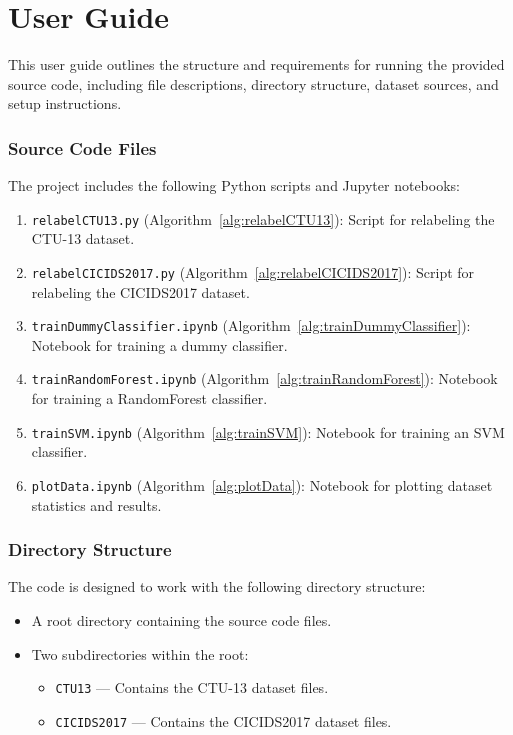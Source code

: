 \chapter{User Guide}\label{chap:user-guide}

This user guide outlines the structure and requirements for running the provided source code, including file descriptions, directory structure, dataset sources, and setup instructions.

\subsection{Source Code Files}

The project includes the following Python scripts and Jupyter notebooks:

\begin{enumerate}
    \item \texttt{relabelCTU13.py} (Algorithm~\ref{alg:relabelCTU13}): Script for relabeling the CTU-13 dataset.
    \item \texttt{relabelCICIDS2017.py} (Algorithm~\ref{alg:relabelCICIDS2017}): Script for relabeling the CICIDS2017 dataset.
    \item \texttt{trainDummyClassifier.ipynb} (Algorithm~\ref{alg:trainDummyClassifier}): Notebook for training a dummy classifier.
    \item \texttt{trainRandomForest.ipynb} (Algorithm~\ref{alg:trainRandomForest}): Notebook for training a RandomForest classifier.
    \item \texttt{trainSVM.ipynb} (Algorithm~\ref{alg:trainSVM}): Notebook for training an SVM classifier.
    \item \texttt{plotData.ipynb} (Algorithm~\ref{alg:plotData}): Notebook for plotting dataset statistics and results.
\end{enumerate}

\subsection{Directory Structure}

The code is designed to work with the following directory structure:

\begin{itemize}
    \item A root directory containing the source code files.
    \item Two subdirectories within the root:
    \begin{itemize}
        \item \texttt{CTU13} --- Contains the CTU-13 dataset files.
        \item \texttt{CICIDS2017} --- Contains the CICIDS2017 dataset files.
    \end{itemize}
\end{itemize}

